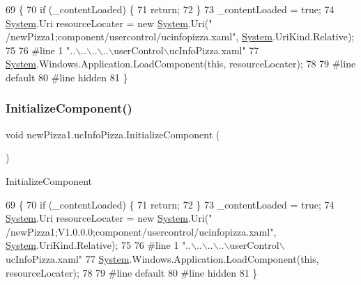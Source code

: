 \begin{DoxyCode}
69                                           \{
70             \textcolor{keywordflow}{if} (\_contentLoaded) \{
71                 \textcolor{keywordflow}{return};
72             \}
73             \_contentLoaded = \textcolor{keyword}{true};
74             \hyperlink{namespaceSystem}{System}.Uri resourceLocater = \textcolor{keyword}{new} \hyperlink{namespaceSystem}{System}.Uri(\textcolor{stringliteral}{"
      /newPizza1;component/usercontrol/ucinfopizza.xaml"}, \hyperlink{namespaceSystem}{System}.UriKind.Relative);
75             
76 \textcolor{preprocessor}{            #line 1 "..\(\backslash\)..\(\backslash\)..\(\backslash\)..\(\backslash\)userControl\(\backslash\)ucInfoPizza.xaml"
}
77             \hyperlink{namespaceSystem}{System}.Windows.Application.LoadComponent(\textcolor{keyword}{this}, resourceLocater);
78             
79 \textcolor{preprocessor}{            #line default
}
80 \textcolor{preprocessor}{            #line hidden
}
81         \}
\end{DoxyCode}
\mbox{\label{classnewPizza1_1_1ucInfoPizza_a5d6e37c02a381d24941d4f45b4a21dbe}} 
\subsubsection{\texorpdfstring{Initialize\+Component()}{InitializeComponent()}\hspace{0.1cm}{\footnotesize\ttfamily [6/6]}}
{\footnotesize\ttfamily void new\+Pizza1.\+uc\+Info\+Pizza.\+Initialize\+Component (\begin{DoxyParamCaption}{ }\end{DoxyParamCaption})\hspace{0.3cm}{\ttfamily [inline]}}



Initialize\+Component 


\begin{DoxyCode}
69                                           \{
70             \textcolor{keywordflow}{if} (\_contentLoaded) \{
71                 \textcolor{keywordflow}{return};
72             \}
73             \_contentLoaded = \textcolor{keyword}{true};
74             \hyperlink{namespaceSystem}{System}.Uri resourceLocater = \textcolor{keyword}{new} \hyperlink{namespaceSystem}{System}.Uri(\textcolor{stringliteral}{"
      /newPizza1;V1.0.0.0;component/usercontrol/ucinfopizza.xaml"}, \hyperlink{namespaceSystem}{System}.UriKind.Relative);
75             
76 \textcolor{preprocessor}{            #line 1 "..\(\backslash\)..\(\backslash\)..\(\backslash\)..\(\backslash\)userControl\(\backslash\)ucInfoPizza.xaml"}
77             \hyperlink{namespaceSystem}{System}.Windows.Application.LoadComponent(\textcolor{keyword}{this}, resourceLocater);
78             
79 \textcolor{preprocessor}{            #line default}
80 \textcolor{preprocessor}{            #line hidden}
81         \}
\end{DoxyCode}


